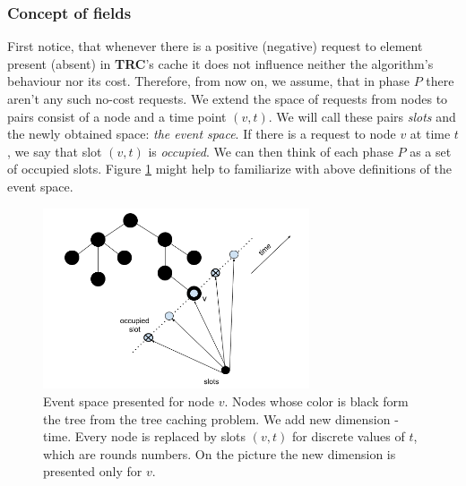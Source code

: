 \subsubsection{Concept of fields} First notice, that whenever there is a
positive (negative) request to element present (absent) in \textbf{TRC}'s cache
it does not influence neither the algorithm's behaviour nor its cost. Therefore,
from now on, we assume, that in phase $P$ there aren't any such no-cost
requests. We extend the space of requests from nodes to pairs consist of a node
and a time point $(v, t)$. We will call these pairs \textit{slots} and the newly
obtained space: \textit{the event space}. If there is a request to node $v$ at
time $t$, we say that slot $(v, t)$ is \textit{occupied}. We can then think of
each phase $P$ as a set of occupied slots. Figure \ref{fig:spacial_temporal}
might help to familiarize with above definitions of the event space.
\begin{figure} \begin{center}
\includegraphics[width=0.7\textwidth]{spacial_temporal.png} \end{center}
\caption{Event space presented for node $v$. Nodes whose color is black form the
tree from the tree caching problem.  We add new dimension - time. Every node is
replaced by slots $(v, t)$ for discrete values of $t$, which are rounds numbers.
On the picture the new dimension is presented only for $v$.}
\label{fig:spacial_temporal} \end{figure}


